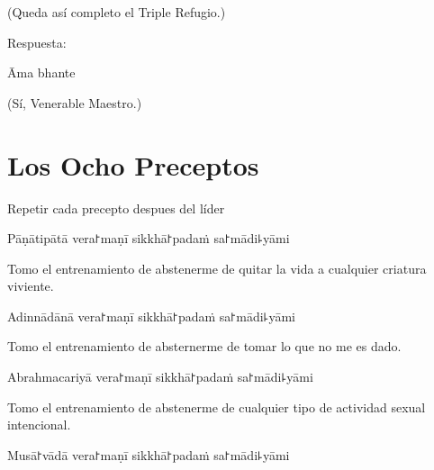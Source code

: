 \begin{english}
  (Queda así completo el Triple Refugio.)
\end{english}

\begin{instruction}
  Respuesta:
\end{instruction}

Āma bhante

\begin{english}
  (Sí, Venerable Maestro.)
\end{english}

\chapter{Los Ocho Preceptos}

\begin{instruction}
  Repetir cada precepto despues del líder
\end{instruction}

\begin{precept}
  \setcounter{enumi}{0}
  \item Pāṇātipātā vera꜓maṇī sikkhā꜓padaṁ sa꜓mādi꜕yāmi
\end{precept}

\begin{english}
  Tomo el entrenamiento de abstenerme de quitar la vida a cualquier criatura viviente.
\end{english}

\begin{precept}
  \setcounter{enumi}{1}
  \item Adinnādānā vera꜓maṇī sikkhā꜓padaṁ sa꜓mādi꜕yāmi
\end{precept}

\begin{english}
  Tomo el entrenamiento de absternerme de tomar lo que no me es dado.
\end{english}

\begin{precept}
  \setcounter{enumi}{2}
  \item Abrahmacariyā vera꜓maṇī sikkhā꜓padaṁ sa꜓mādi꜕yāmi
\end{precept}

\begin{english}
  Tomo el entrenamiento de abstenerme de cualquier tipo de actividad sexual intencional.
\end{english}

\begin{precept}
  \setcounter{enumi}{3}
  \item Musā꜓vādā vera꜓maṇī sikkhā꜓padaṁ sa꜓mādi꜕yāmi
\end{precept}

